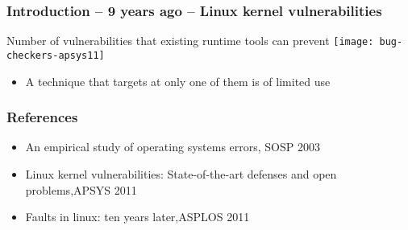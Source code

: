 \begin{frame}[plain]
	\frametitle{Introduction -- 9 years ago -- Linux kernel vulnerabilities}
	\centering
	 Number of vulnerabilities that existing runtime tools can prevent
	\texttt{[image: bug-checkers-apsys11]}
	
	\begin{itemize}
	
	\item A technique that targets at only one of them is of limited use	
    \end{itemize}
\end{frame}

\begin{frame}[plain]
	\frametitle{References}

	\begin{itemize}
		
		\item  An empirical study of operating systems errors, SOSP 2003
		\item Linux kernel vulnerabilities: State-of-the-art defenses and open problems,APSYS 2011
		\item  Faults in linux: ten years later,ASPLOS 2011
		
	\end{itemize}
	
	
\end{frame}
